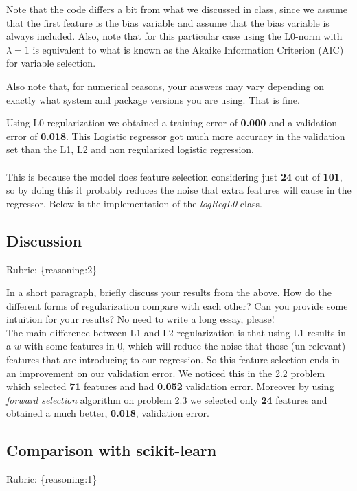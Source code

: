 \documentclass{article}
\def\rubric#1{\gre{Rubric: \{#1\}}}{}
\def\gre#1{{\color{gre}#1}}
\def\ans#1{{\color{ans}#1}}
\begin{document}
Note that the code differs a bit from what we discussed in class,
since we assume that the first feature is the bias variable and assume that the
bias variable is always included. Also, note that for this particular case using
the L0-norm with $\lambda=1$ is equivalent to what is known as the Akaike
Information Criterion (AIC) for variable selection.

Also note that, for numerical reasons, your answers may vary depending on exactly what system and package versions you are using. That is fine.

\ans{
    Using L0 regularization we obtained a training error of \textbf{0.000} and a validation error of \textbf{0.018}.
    This Logistic regressor got much more accuracy in the validation set than the L1, L2 and 
    non regularized logistic regression. \\ \\
    This is because the model does feature selection considering just \textbf{24} out of \textbf{101}, so by doing this 
    it probably reduces the noise that extra features will cause in the regressor.
    Below is the implementation of the \emph{logRegL0} class.
}
\begin{center}
     
\end{center}

\subsection{Discussion}
\rubric{reasoning:2}

In a short paragraph, briefly discuss your results from the above. How do the
different forms of regularization compare with each other?
Can you provide some intuition for your results? No need to write a long essay, please! \\
\ans{
    The main difference between L1 and L2 regularization is that using L1 results in a $w$ 
    with some features in 0, which will reduce the noise that those (un-relevant) features that 
    are introducing to our regression. 
    So this feature selection ends in an improvement on our validation error. 
    We noticed this in the 2.2 problem which selected \textbf{71} features and had \textbf{0.052} 
    validation error. Moreover by using \emph{forward selection} algorithm on problem 2.3 we
    selected only \textbf{24} features and obtained a much better, \textbf{0.018}, validation error.
}

\subsection{Comparison with scikit-learn}
\rubric{reasoning:1}
\end{document}

